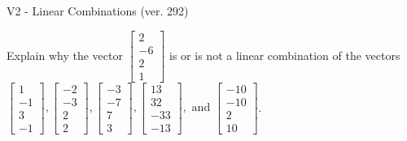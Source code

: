\begin{exercise}
  \begin{exerciseTitle}V2 - Linear Combinations (ver. 292)\end{exerciseTitle}
  \begin{exerciseStatement}
    Explain why the vector \(\left[\begin{array}{c}
2 \\
-6 \\
2 \\
1
\end{array}\right]\)  is or is not a linear 
	combination of the vectors \(\left[\begin{array}{c}
1 \\
-1 \\
3 \\
-1
\end{array}\right] , \left[\begin{array}{c}
-2 \\
-3 \\
2 \\
2
\end{array}\right] , \left[\begin{array}{c}
-3 \\
-7 \\
7 \\
3
\end{array}\right] , \left[\begin{array}{c}
13 \\
32 \\
-33 \\
-13
\end{array}\right] , \text{ and } \left[\begin{array}{c}
-10 \\
-10 \\
2 \\
10
\end{array}\right]\).
	



\end{exerciseStatement}
\end{exercise}
